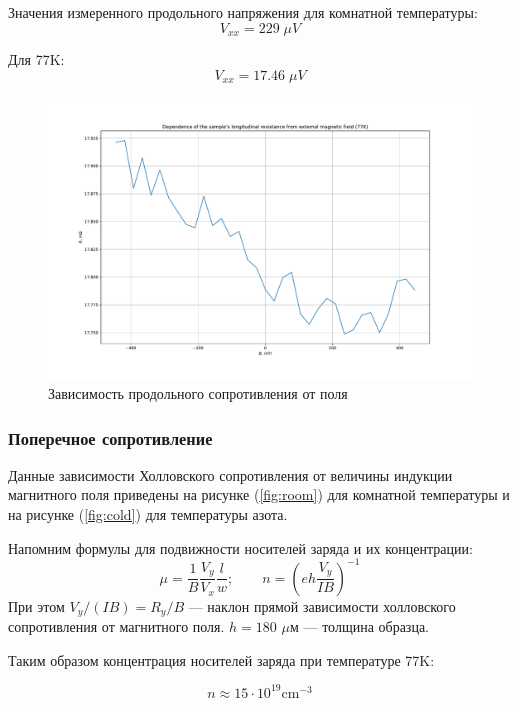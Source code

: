 \documentclass[a4paper, 12pt]{article}
\begin{document}
Значения измеренного продольного напряжения для комнатной температуры:
$$V_{xx} = 229 \; \mu V  $$

Для 77K:
$$V_{xx} = 17.46 \; \mu V $$

\begin{figure}[H]
	\centering
	\includegraphics[width=\linewidth]{3_longitudunal.pdf}
	\caption{Зависимость продольного сопротивления от поля}
	\label{fig:3_long}
\end{figure}

\subsubsection{Поперечное сопротивление}

Данные зависимости Холловского сопротивления от величины индукции магнитного поля приведены на рисунке (\ref{fig:room}) для комнатной температуры и на рисунке (\ref{fig:cold}) для температуры азота.

Напомним формулы для подвижности носителей заряда и их концентрации:
$$\mu=\frac{1}{B}\frac{V_y}{V_x}\frac{l}{w}; \qquad n=\left(eh\frac{V_y}{IB}\right)^{-1}  $$
При этом $V_y/(IB) = R_y/B$ --- наклон прямой зависимости холловского сопротивления от магнитного поля. $h = 180$ $\mu$м --- толщина образца.

Таким образом концентрация носителей заряда при температуре 77K:

$$n\approx15 \cdot 10^{19}\text{cm}^{-3}$$ 
\end{document}
